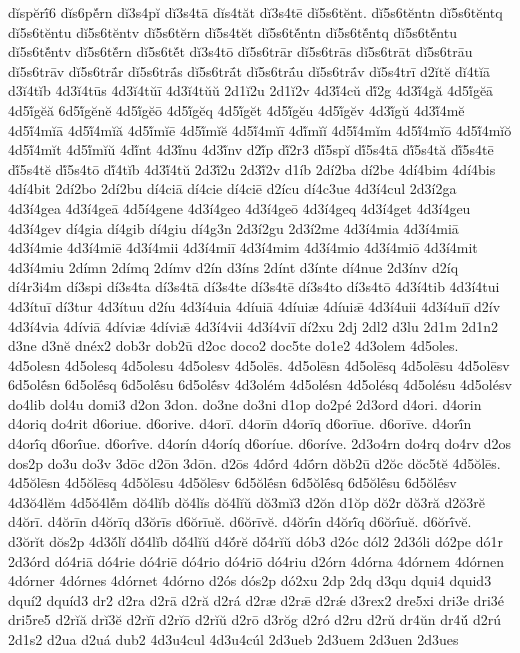 {dĭspĕrī́6
dĭs6pĕ́rn
dĭ3s4pĭ
dĭ3s4tā
dĭs4tăt
dĭ3s4tē
dĭ5s6tĕnt.
dĭ5s6tĕntn
dĭ5s6tĕntq
dĭ5s6tĕntu
dĭ5s6tĕntv
dĭ5s6tĕrn
dĭ5s4tĕt
dĭ5s6tĕ́ntn
dĭ5s6tĕ́ntq
dĭ5s6tĕ́ntu
dĭ5s6tĕ́ntv
dĭ5s6tĕ́rn
dĭ5s6tĕ́t
dĭ3s4tō
dĭ5s6trār
dĭ5s6trās
dĭ5s6trāt
dĭ5s6trāu
dĭ5s6trāv
dĭ5s6trā́r
dĭ5s6trā́s
dĭ5s6trā́t
dĭ5s6trā́u
dĭ5s6trā́v
dĭ5s4trī
d2ĭtĕ
dĭ4tĭā
d3ĭ4tĭb
4d3ĭ4tūs
4d3ĭ4tŭī
4d3ĭ4tŭŭ
2d1ĭ2u
2d1ĭ2v
4d3ĭ́4cŭ
dĭ́2g
4d3ĭ́4gă
4d5ĭ́gĕā
4d5ĭ́gĕă
6d5ĭ́gĕnĕ
4d5ĭ́gĕō
4d5ĭ́gĕq
4d5ĭ́gĕt
4d5ĭ́gĕu
4d5ĭ́gĕv
4d3ĭ́gŭ
4d3ĭ́4mĕ
4d5ĭ́4mĭā
4d5ĭ́4mĭă
4d5ĭ́mĭē
4d5ĭ́mĭĕ
4d5ĭ́4mĭī
4dĭ́mĭĭ
4d5ĭ́4mĭm
4d5ĭ́4mĭō
4d5ĭ́4mĭŏ
4d5ĭ́4mĭt
4d5ĭ́mĭŭ
4dĭ́nt
4d3ĭ́nu
4d3ĭ́nv
d2ĭ́p
dĭ́2r3
dĭ́5spĭ
dĭ́5s4tā
dĭ́5s4tă
dĭ́5s4tē
dĭ́5s4tĕ
dĭ́5s4tō
dĭ́4tĭb
4d3ĭ́4tŭ
2d3ĭ́2u
2d3ĭ́2v
d1íb
2dí2ba
dí2be
4dí4bim
4dí4bis
4dí4bit
2dí2bo
2dí2bu
dí4ciā
dí4cie
dí4ciē
d2ícu
dí4c3ue
4d3í4cul
2d3í2ga
4d3í4gea
4d3í4geā
4d5í4gene
4d3í4geo
4d3í4geō
4d3í4geq
4d3í4get
4d3í4geu
4d3í4gev
dí4gia
dí4gib
dí4giu
dí4g3n
2d3í2gu
2d3í2me
4d3í4mia
4d3í4miā
4d3í4mie
4d3í4miē
4d3í4mii
4d3í4miī
4d3í4mim
4d3í4mio
4d3í4miō
4d3í4mit
4d3í4miu
2dímn
2dímq
2dímv
d2ín
d3íns
2dínt
d3ínte
dí4nue
2d3ínv
d2íq
dí4r3i4m
dí3spi
dí3s4ta
dí3s4tā
dí3s4te
dí3s4tē
dí3s4to
dí3s4tō
4d3í4tib
4d3í4tui
4d3ítuī
dí3tur
4d3ítuu
d2íu
4d3í4uia
4díuiā
4díuiæ
4díuiǣ
4d3í4uii
4d3í4uiī
d2ív
4d3í4via
4díviā
4díviæ
4díviǣ
4d3í4vii
4d3í4viī
dí2xu
2dj
2dl2
d3lu
2d1m
2d1n2
d3ne
d3nĕ
dnéx2
dob3r
dob2ū
d2oc
doco2
doc5te
do1e2
4d3olem
4d5oles.
4d5olesn
4d5olesq
4d5olesu
4d5olesv
4d5olēs.
4d5olēsn
4d5olēsq
4d5olēsu
4d5olēsv
6d5olḗsn
6d5olḗsq
6d5olḗsu
6d5olḗsv
4d3olém
4d5olésn
4d5olésq
4d5olésu
4d5olésv
do4lib
dol4u
domi3
d2on
3don.
do3ne
do3ni
d1op
do2pé
2d3ord
d4ori.
d4orin
d4oriq
do4rit
d6oriue.
d6orive.
d4orī.
d4orīn
d4orīq
d6orīue.
d6orīve.
d4orī́n
d4orī́q
d6orī́ue.
d6orī́ve.
d4orín
d4oríq
d6oríue.
d6oríve.
2d3o4rn
do4rq
do4rv
d2os
dos2p
do3u
do3v
3dōc
d2ōn
3dōn.
d2ōs
4dṓrd
4dṓrn
dŏb2ū
d2ŏc
dŏc5tĕ
4d5ŏlēs.
4d5ŏlēsn
4d5ŏlēsq
4d5ŏlēsu
4d5ŏlēsv
6d5ŏlḗsn
6d5ŏlḗsq
6d5ŏlḗsu
6d5ŏlḗsv
4d3ŏ4lĕm
4d5ŏ4lĕ́m
dŏ4lĭb
dŏ4lĭs
dŏ4lĭŭ
dŏ3mĭ3
d2ŏn
d1ŏp
dŏ2r
dŏ3ră
d2ŏ3rĕ
d4ŏrī.
d4ŏrīn
d4ŏrīq
d3ŏrīs
d6ŏrīuĕ.
d6ŏrīvĕ.
d4ŏrī́n
d4ŏrī́q
d6ŏrī́uĕ.
d6ŏrī́vĕ.
d3ŏrĭt
dŏs2p
4d3ŏ́lĭ
dŏ́4lĭb
dŏ́4lĭŭ
d4ŏ́rĕ
dŏ́4rĭŭ
dób3
d2óc
dól2
2d3óli
dó2pe
dó1r
2d3órd
dó4riā
dó4rie
dó4riē
dó4rio
dó4riō
dó4riu
d2órn
4dórna
4dórnem
4dórnen
4dórner
4dórnes
4dórnet
4dórno
d2ós
dós2p
dó2xu
2dp
2dq
d3qu
dqui4
dquid3
dquí2
dquíd3
dr2
d2ra
d2rā
d2ră
d2rá
d2ræ
d2rǣ
d2rǽ
d3rex2
dre5xi
dri3e
dri3é
dri5re5
d2rĭă
drĭ3ĕ
d2rĭī
d2rĭō
d2rĭŭ
d2rō
d3rŏg
d2ró
d2ru
d2rŭ
dr4ŭn
dr4ŭ́
d2rú
2d1s2
d2ua
d2uá
dub2
4d3u4cul
4d3u4cúl
2d3ueb
2d3uem
2d3uen
2d3ues
}
